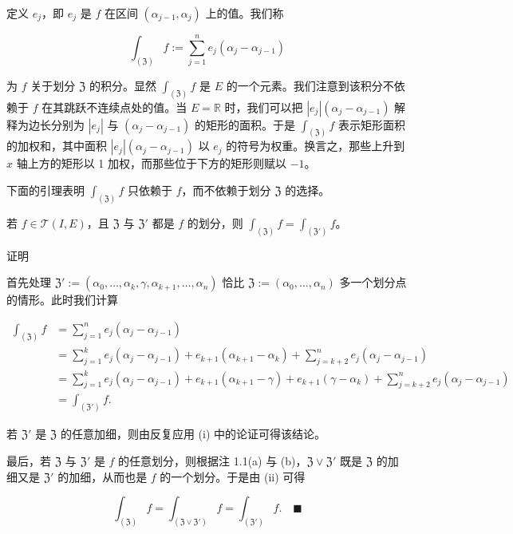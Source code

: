 定义 $ e_j $，即 $ e_j $ 是 $ f $ 在区间 $ (\alpha_{j-1}, \alpha_j) $ 上的值。我们称

\[
\int_{(\mathfrak{Z})} f := \sum_{j=1}^{n} e_j(\alpha_j - \alpha_{j-1})
\]

为 $ f $ 关于划分 $ \mathfrak{Z} $ 的积分。显然 $ \int_{(\mathfrak{Z})} f $ 是 $ E $ 的一个元素。我们注意到该积分不依赖于 $ f $ 在其跳跃不连续点处的值。当 $ E = \mathbb{R} $ 时，我们可以把 $ \left| e_j \right| (\alpha_j - \alpha_{j-1}) $ 解释为边长分别为 $ \left| e_j \right| $ 与 $ (\alpha_j - \alpha_{j-1}) $ 的矩形的面积。于是 $ \int_{(\mathfrak{Z})} f $ 表示矩形面积的加权和，其中面积 $ \left| e_j \right| (\alpha_j - \alpha_{j-1}) $ 以 $ e_j $ 的符号为权重。换言之，那些上升到 $ x $ 轴上方的矩形以 1 加权，而那些位于下方的矩形则赋以 $ -1 $。


下面的引理表明 $ \int_{(\mathfrak{Z})} f $ 只依赖于 $ f $，而不依赖于划分 $ \mathfrak{Z} $ 的选择。

\begin{lemma}

若 $ f \in \mathcal{T}(I, E) $，且 $ \mathfrak{Z} $ 与 $ \mathfrak{Z}' $ 都是 $ f $ 的划分，则 $ \int_{(\mathfrak{Z})} f = \int_{(\mathfrak{Z}')} f $。

证明

\begin{subitems}
\item

首先处理 $ \mathfrak{Z}' := (\alpha_0, \ldots, \alpha_k, \gamma, \alpha_{k+1}, \ldots, \alpha_n) $ 恰比 $ \mathfrak{Z} := (\alpha_0, \ldots, \alpha_n) $ 多一个划分点的情形。此时我们计算

\begin{equation*}
\begin{aligned}
\int_{(\mathfrak{Z})} f &= \sum_{j=1}^{n} e_j(\alpha_j - \alpha_{j-1}) \\ &= \sum_{j=1}^{k} e_j(\alpha_j - \alpha_{j-1}) + e_{k+1}(\alpha_{k+1} - \alpha_k) + \sum_{j=k+2}^{n} e_j(\alpha_j - \alpha_{j-1}) \\ &= \sum_{j=1}^{k} e_j(\alpha_j - \alpha_{j-1}) + e_{k+1}(\alpha_{k+1} - \gamma) + e_{k+1}(\gamma - \alpha_k) + \sum_{j=k+2}^{n} e_j(\alpha_j - \alpha_{j-1}) \\ &= \int_{(\mathfrak{Z}')} f .
\end{aligned}
\end{equation*}
\item

若 $ \mathfrak{Z}' $ 是 $ \mathfrak{Z} $ 的任意加细，则由反复应用 (i) 中的论证可得该结论。

\item

最后，若 $ \mathfrak{Z} $ 与 $ \mathfrak{Z}' $ 是 $ f $ 的任意划分，则根据注 1.1(a) 与 (b)，$ \mathfrak{Z} \vee \mathfrak{Z}' $ 既是 $ \mathfrak{Z} $ 的加细又是 $ \mathfrak{Z}' $ 的加细，从而也是 $ f $ 的一个划分。于是由 (ii) 可得

\[
\int_{(\mathfrak{Z})} f = \int_{(\mathfrak{Z} \vee \mathfrak{Z}')} f = \int_{(\mathfrak{Z}')} f .\quad\blacksquare
\]
\end{subitems}

\end{lemma}

